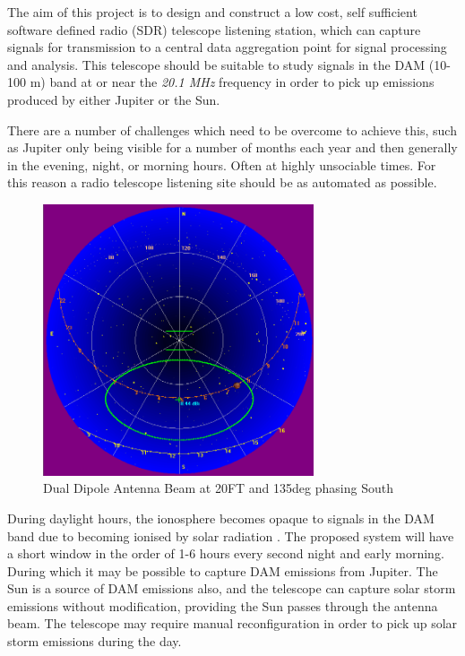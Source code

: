 \documentclass[runningheads,a4paper]{llncs}
\begin{document}
The aim of this project is to design and construct a low cost, self sufficient software defined radio (\gls{SDR}) telescope listening station, which can capture signals for transmission to a central data aggregation point for signal processing and analysis. This telescope should be suitable to study signals  in the \gls{DAM} (10-100 m) band at or near the \textit{20.1 MHz} frequency in order to pick up emissions produced by either Jupiter or the Sun.

There are a number of challenges which need to be overcome to achieve this, such as Jupiter only being visible for a number of months each year and then generally in the evening, night, or morning hours. Often at highly unsociable times. For this reason a radio telescope listening site should be as automated as possible.

%
\begin{figure}[here]
\centering
\includegraphics[width=8cm]{images/07}
\caption{Dual Dipole Antenna Beam at 20FT and 135deg phasing South \citep{nasa12}}
\label{fig:dual_dipole_20ft_135phasing_s}
\end{figure}
%

During daylight hours, the ionosphere becomes opaque to signals in the \gls{DAM} band due to becoming ionised by solar radiation \citep{nasa-ionosphere-12}. The proposed system will have a short window in the order of 1-6 hours every second night and early morning. During which it may be possible to capture \gls{DAM} emissions from Jupiter. The Sun is a source of \gls{DAM} emissions also, and the telescope can capture solar storm emissions without modification, providing the Sun passes through the antenna beam. The telescope may require manual reconfiguration in order to pick up solar storm emissions during the day.
\end{document}
